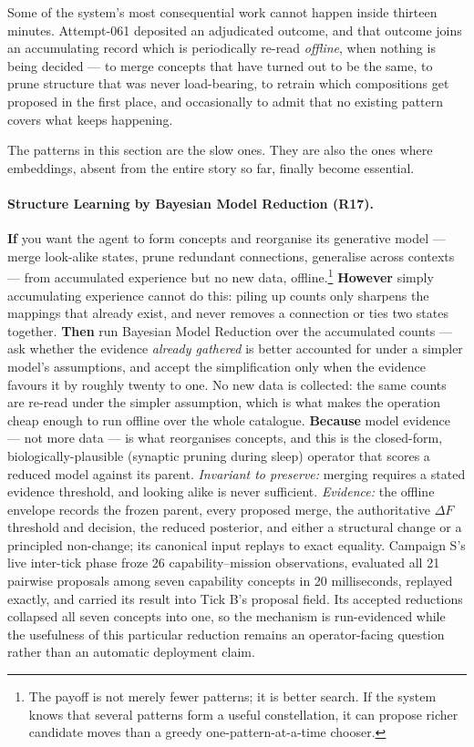 Some of the system's most consequential work cannot happen inside thirteen
minutes.  Attempt-061 deposited an adjudicated outcome, and that outcome joins
an accumulating record which is periodically re-read \emph{offline}, when
nothing is being decided --- to merge concepts that have turned out to be the
same, to prune structure that was never load-bearing, to retrain which
compositions get proposed in the first place, and occasionally to admit that no
existing pattern covers what keeps happening.

The patterns in this section are the slow ones.  They are also the ones where
embeddings, absent from the entire story so far, finally become essential.

\paragraph{Structure Learning by Bayesian Model Reduction (R17).} \textbf{If} you want the agent to form concepts and reorganise its generative model --- merge look-alike states, prune redundant connections, generalise across contexts --- from accumulated experience but no new data, offline.\footnote{The payoff is not merely fewer patterns; it is better search. If the system knows that several patterns form a useful constellation, it can propose richer candidate moves than a greedy one-pattern-at-a-time chooser.} \textbf{However} simply accumulating experience cannot do this: piling up counts only sharpens the mappings that already exist, and never removes a connection or ties two states together. \textbf{Then} run Bayesian Model Reduction over the accumulated counts --- ask whether the evidence \emph{already gathered} is better accounted for under a simpler model's assumptions, and accept the simplification only when the evidence favours it by roughly twenty to one.  No new data is collected: the same counts are re-read under the simpler assumption, which is what makes the operation cheap enough to run offline over the whole catalogue. \textbf{Because} model evidence --- not more data --- is what reorganises concepts, and this is the closed-form, biologically-plausible (synaptic pruning during sleep) operator that scores a reduced model against its parent.  \emph{Invariant to preserve:} merging requires a stated evidence threshold, and looking alike is never sufficient.  \emph{Evidence:} the offline envelope records the frozen parent, every proposed merge, the authoritative $\Delta F$ threshold and decision, the reduced posterior, and either a structural change or a principled non-change; its canonical input replays to exact equality.  Campaign S's live inter-tick phase froze 26 capability--mission observations, evaluated all 21 pairwise proposals among seven capability concepts in 20 milliseconds, replayed exactly, and carried its result into Tick B's proposal field.  Its accepted reductions collapsed all seven concepts into one, so the mechanism is run-evidenced while the usefulness of this particular reduction remains an operator-facing question rather than an automatic deployment claim.
